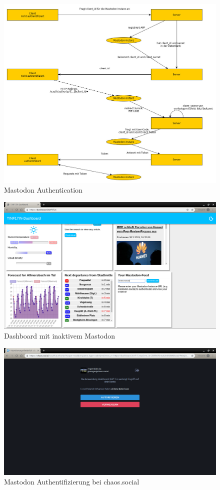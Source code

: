 \documentclass[fleqn,10pt]{SelfArx} %
\begin{document}
\begin{figure}
\includegraphics[width=\linewidth]{mastodon.jpg}
\caption{Mastodon Authentication}\label{fig:mastodon1}
\end{figure}
\begin{figure}
    \includegraphics[width=\linewidth]{images/1.png}
    \caption{Dashboard mit inaktivem Mastodon}\label{fig:demo1}
\end{figure}
\begin{figure}
\includegraphics[width=\linewidth]{images/2.png}
\caption{Mastodon Authentifizierung bei chaos.social}\label{fig:demo2}
\end{figure}
\end{document}
